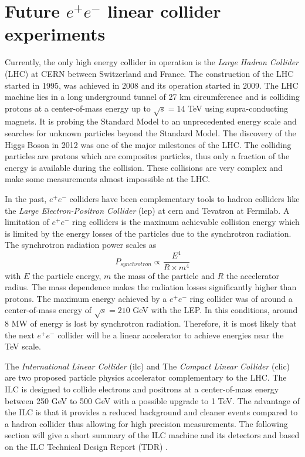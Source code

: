 \chapter{Future $e^+e^-$ linear collider experiments}
\label{chap:FutureColliders}

Currently, the only high energy collider in operation is the \textit{Large Hadron Collider} (LHC) at CERN between Switzerland and France. The construction of the LHC started in 1995, was achieved in 2008 and its operation started in 2009. The LHC machine lies in a long underground tunnel of 27 km circumference and is colliding protons at a center-of-mass energy up to $\sqrt{s} = 14$ TeV using supra-conducting magnets. It is probing the Standard Model to an unprecedented energy scale and searches for unknown particles beyond the Standard Model. The discovery of the Higgs Boson in 2012 was one of the major milestones of the LHC. The colliding particles are protons which are composites particles, thus only a fraction of the energy is available during the collision. These collisions are very complex and make some measurements almost impossible at the LHC.

In the past, $e^+e^-$ colliders have been complementary tools to hadron colliders like the \textit{Large Electron-Positron Collider} (\acrshort{lep}) at \acrshort{cern} and Tevatron at Fermilab. A limitation of $e^+e^-$ ring colliders is the maximum achievable collision energy which is limited by the energy losses of the particles due to the synchrotron radiation. The synchrotron radiation power scales as
\begin{equation}
  P_{synchrotron} \propto \frac{E^4}{R \times m^4}
\end{equation}
with $E$ the particle energy, $m$ the mass of the particle and $R$ the accelerator radius. The mass dependence makes the radiation losses significantly higher than protons. The maximum energy achieved by a $e^+e^-$ ring collider was of around a center-of-mass energy of $\sqrt{s} = 210$ GeV with the LEP. In this conditions, around 8 MW of energy is lost by synchrotron radiation.
Therefore, it is most likely that the next $e^+e^-$ collider will be a linear accelerator to achieve energies near the TeV scale.

The \textit{International Linear Collider} (\acrshort{ilc}) and The \textit{Compact Linear Collider} (\acrshort{clic}) are two proposed particle physics accelerator complementary to the LHC. The ILC is designed to collide electrons and positrons at a center-of-mass energy between 250 GeV to 500 GeV with a possible upgrade to 1 TeV. The advantage of the ILC is that it provides a reduced background and cleaner events compared to a hadron collider thus allowing for high precision measurements. The following section will give a short summary of the ILC machine and its detectors and based on the ILC Technical Design Report (TDR) \cite{ILC_TDR_Vol1, ILC_TDR_Vol2, ILC_TDR_Vol3.1, ILC_TDR_Vol3.2, ILC_TDR_Vol4}.

